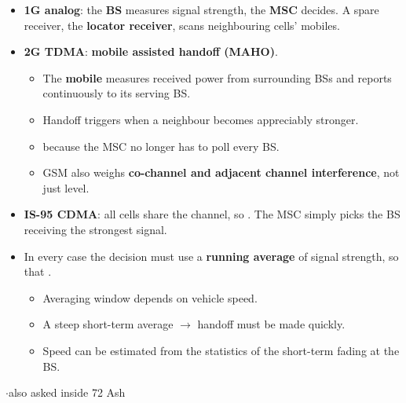 \begin{itemize}
  \item \textbf{1G analog}: the \textbf{BS} measures signal strength, the \textbf{MSC} decides.
        A spare receiver, the \textbf{locator receiver}, scans neighbouring cells' mobiles.
  \item \textbf{2G TDMA}: \textbf{mobile assisted handoff (MAHO)}.
  \begin{itemize}
    \item The \textbf{mobile} measures received power from surrounding BSs and reports
          continuously to its serving BS.
    \item Handoff triggers when a neighbour becomes appreciably stronger.
    \item {} because the MSC no longer has to poll every BS.
    \item GSM also weighs \textbf{co-channel and adjacent channel interference}, not just level.
  \end{itemize}
  \item \textbf{IS-95 CDMA}: all cells share the channel, so . The MSC simply picks the BS receiving the strongest signal.
  \item In every case the decision must use a \textbf{running average} of signal strength, so that
        .
  \begin{itemize}
    \item Averaging window depends on vehicle speed.
    \item A steep short-term average $\rightarrow$ handoff must be made quickly.
    \item Speed can be estimated from the statistics of the short-term fading at the BS.
  \end{itemize}
\end{itemize}

{\color{sub}\footnotesize {}  \gap$\cdot$\gap also asked inside
72 Ash }

